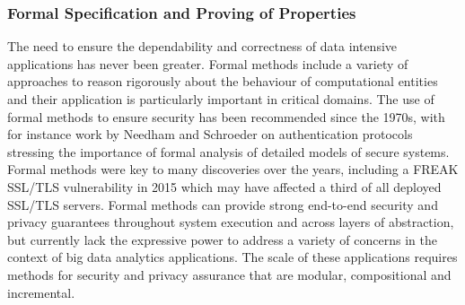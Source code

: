 \documentclass[a4paper,11pt]{article}
\begin{document}
\subsubsection{Formal Specification and Proving of Properties}
\label{sect:formal}


The need to ensure the dependability and correctness of data intensive applications has never been greater. 
Formal methods include a variety of approaches to reason rigorously about the behaviour of computational entities and their application is particularly important in critical domains. 
The use of formal methods to ensure security has been recommended since the 1970s, with for instance work by Needham and Schroeder on authentication protocols~\cite{needham1978} stressing the importance of formal analysis of detailed models of secure systems. Formal methods were key to many discoveries over the years, including
a FREAK SSL/TLS vulnerability in 2015 \cite{freak2015} which may have affected a third of all deployed SSL/TLS servers.
Formal methods can provide strong end-to-end security 
and privacy guarantees throughout system execution and across layers of abstraction, but currently lack the expressive power to
address a variety of concerns in the context of big data analytics applications.
The scale of these applications requires  methods for security and privacy assurance that are modular, compositional and incremental. 
\end{document}
